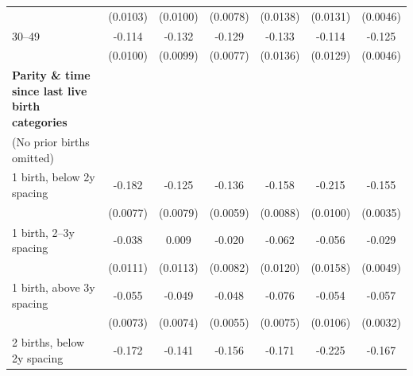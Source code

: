 {\begin{tabular}{l*{6}{c}}
                    &    (0.0103)         &    (0.0100)         &    (0.0078)         &    (0.0138)         &    (0.0131)         &    (0.0046)         \\
\addlinespace
\hspace*{1em}30–49               &      -0.114\sym{***}&      -0.132\sym{***}&      -0.129\sym{***}&      -0.133\sym{***}&      -0.114\sym{***}&      -0.125\sym{***}\\
                    &    (0.0100)         &    (0.0099)         &    (0.0077)         &    (0.0136)         &    (0.0129)         &    (0.0046)         \\
\addlinespace
\textbf{Parity \& time since last live birth categories} \\ (No prior births omitted)&                     &                     &                     &                     &                     &                     \\
\addlinespace
\hspace*{1em}1 birth, below 2y spacing&      -0.182\sym{***}&      -0.125\sym{***}&      -0.136\sym{***}&      -0.158\sym{***}&      -0.215\sym{***}&      -0.155\sym{***}\\
                    &    (0.0077)         &    (0.0079)         &    (0.0059)         &    (0.0088)         &    (0.0100)         &    (0.0035)         \\
\addlinespace
\hspace*{1em}1 birth, 2–3y spacing&      -0.038\sym{***}&       0.009         &      -0.020\sym{*}  &      -0.062\sym{***}&      -0.056\sym{***}&      -0.029\sym{***}\\
                    &    (0.0111)         &    (0.0113)         &    (0.0082)         &    (0.0120)         &    (0.0158)         &    (0.0049)         \\
\addlinespace
\hspace*{1em}1 birth, above 3y spacing&      -0.055\sym{***}&      -0.049\sym{***}&      -0.048\sym{***}&      -0.076\sym{***}&      -0.054\sym{***}&      -0.057\sym{***}\\
                    &    (0.0073)         &    (0.0074)         &    (0.0055)         &    (0.0075)         &    (0.0106)         &    (0.0032)         \\
\addlinespace
\hspace*{1em}2 births, below 2y spacing&      -0.172\sym{***}&      -0.141\sym{***}&      -0.156\sym{***}&      -0.171\sym{***}&      -0.225\sym{***}&      -0.167\sym{***}\\

\end{tabular}}
